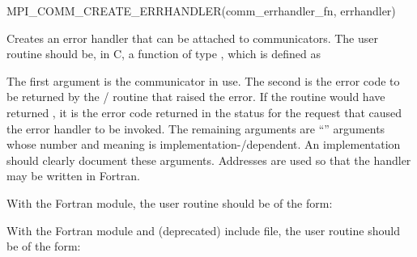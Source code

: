 %
\begin{funcdef}{MPI\_COMM\_CREATE\_ERRHANDLER}{(\mbox{comm\_errhandler\_fn}, \mbox{errhandler})}
\end{funcdef}
%
%

Creates an error handler that can be attached to communicators.
The user routine should be, in C, a
function of type
, which is defined as


The first argument is the communicator in use.
The second is
the error code to be returned by the \MPI/ routine that raised the error.
If the routine would have returned , it is
the error code returned in the status for the request that caused the
error handler to be invoked.
The remaining arguments are ``'' arguments
whose number and meaning is implementation\hyphen/dependent.  An implementation
should clearly document these arguments.
Addresses are used so that the handler may be written in Fortran.

\noindent
With the Fortran  module, the user routine  should be of the form:
 

\noindent
With the Fortran  module and (deprecated)  include file,
the user routine  should be of the form:

